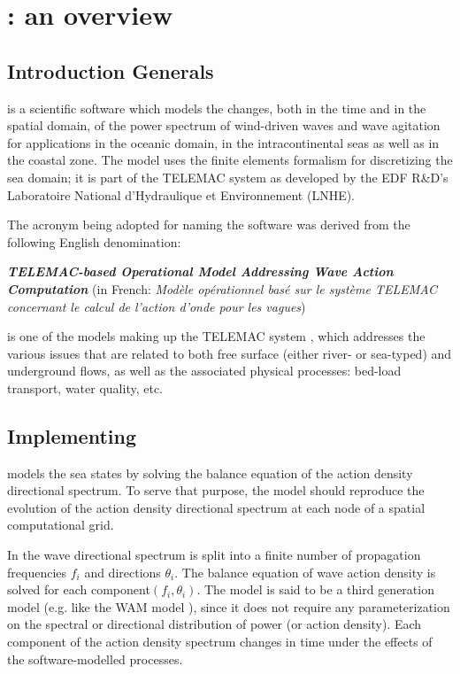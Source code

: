 
\chapter{\tomawac: an overview}


\section{Introduction Generals}

\tomawac is a scientific software which models the changes, both in the time and in the spatial domain, of the power spectrum of wind-driven waves and wave agitation for applications in the oceanic domain, in the intracontinental seas as well as in the coastal zone. The model uses the finite elements formalism for discretizing the sea domain; it is part of the TELEMAC system as developed by the EDF R\&D's Laboratoire National d'Hydraulique et Environnement (LNHE).

The acronym \tomawac being adopted for naming the software was derived from the following English denomination:

 \textbf{\textit{TELEMAC-based Operational Model Addressing Wave Action Computation}}
(in French: \textit{Mod\`ele op\'erationnel bas\'e sur le syst\`eme TELEMAC concernant le calcul de l'action d'onde pour les vagues})

 \tomawac is one of the models making up the TELEMAC system \cite{Hervouet2007}, which addresses the various issues that are related to both free surface (either river- or sea-typed) and underground flows, as well as the associated physical processes: bed-load transport, water quality, etc. 

\section{Implementing \tomawac}

 \tomawac models the sea states by solving the balance equation of the action density directional spectrum. To serve that purpose, the model should reproduce the evolution of the action density directional spectrum at each node of a spatial computational grid.

 In \tomawac the wave directional spectrum is split into a finite number of propagation frequencies $f_{i}$ and directions $\theta_{i}$. The balance equation of wave action density is solved for each component$\left(f_{i} ,\theta _{i} \right)$. The model is said to be a third generation model (e.g. like the WAM model \cite{Wamdi1988} \cite{Komen1994}), since it does not require any parameterization on the spectral or directional distribution of power (or action density). Each component of the action density spectrum changes in time under the effects of the software-modelled processes.



